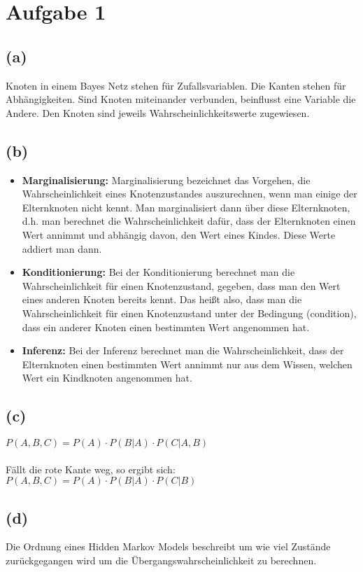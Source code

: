 \documentclass[a4paper]{scrartcl}
\begin{document}
\section*{Aufgabe 1}
\subsection*{(a)}
Knoten in einem Bayes Netz stehen für Zufallsvariablen. Die Kanten stehen für Abhängigkeiten. Sind Knoten miteinander verbunden, beinflusst eine Variable die Andere. Den Knoten sind jeweils Wahrscheinlichkeitswerte zugewiesen.


\subsection*{(b)}
\begin{itemize}
	\item \textbf{Marginalisierung:} Marginalisierung bezeichnet das Vorgehen, die Wahrscheinlichkeit eines Knotenzustandes auszurechnen, wenn man einige der Elternknoten nicht kennt. Man marginalisiert dann über diese Elternknoten, d.h. man berechnet die Wahrscheinlichkeit dafür, dass der Elternknoten einen Wert annimmt und abhängig davon, den Wert eines Kindes. Diese Werte addiert man dann.
	\item \textbf{Konditionierung:} Bei der Konditionierung berechnet man die Wahrscheinlichkeit für einen Knotenzustand, gegeben, dass man den Wert eines anderen Knoten bereits kennt. Das heißt also, dass man die Wahrscheinlichkeit für einen Knotenzustand unter der Bedingung (condition), dass ein anderer Knoten einen bestimmten Wert angenommen hat.
	\item \textbf{Inferenz:} Bei der Inferenz berechnet man die Wahrscheinlichkeit, dass der Elternknoten einen bestimmten Wert annimmt nur aus dem Wissen, welchen Wert ein Kindknoten angenommen hat.
\end{itemize}


\subsection*{(c)}
$P(A,B,C) = P(A) \cdot P(B|A) \cdot P(C|A,B)$\\
\\
Fällt die rote Kante weg, so ergibt sich:\\
$P(A,B,C) = P(A) \cdot P(B|A) \cdot P(C|B)$




\subsection*{(d)}
Die Ordnung eines Hidden Markov Models beschreibt um wie viel Zustände zurückgegangen wird um die Übergangswahrscheinlichkeit zu berechnen. 
\end{document}
